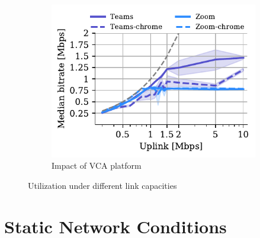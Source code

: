 \begin{figure}[ht!]
\begin{subfigure}[t]{0.33\textwidth}
\centering
    \includegraphics[width=\textwidth,keepaspectratio]{figures/static/uplink_browser.pdf}
    \caption{Impact of VCA platform}
	\label{subfig:uplink_browser}
\end{subfigure} 
\caption{Utilization under different link capacities}
\label{fig:static}
\end{figure}

\section{Static Network Conditions}\label{sec:static}

